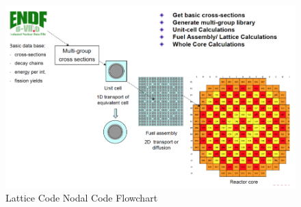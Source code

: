 \documentclass{school-22.211-notes}
\begin{document}
\begin{figure}[ht]
  \centering
  \includegraphics[width=6in]{images/design/lattice-nodal-code.png}
  \caption{Lattice Code Nodal Code Flowchart} \label{lattice-nodal-code}
\end{figure}
\end{document}
